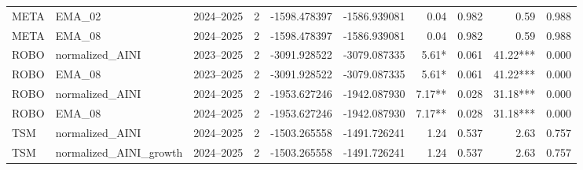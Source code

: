 \begin{table}[H]
{\begin{tabular}{l l l r r r r r r r}
META & EMA\_02 & 2024--2025 & 2 & -1598.478397 & -1586.939081 & 0.04 & 0.982 & 0.59 & 0.988 \\
META & EMA\_08 & 2024--2025 & 2 & -1598.478397 & -1586.939081 & 0.04 & 0.982 & 0.59 & 0.988 \\
ROBO & normalized\_AINI & 2023--2025 & 2 & -3091.928522 & -3079.087335 & 5.61* & 0.061 & 41.22*** & 0.000 \\
ROBO & EMA\_08 & 2023--2025 & 2 & -3091.928522 & -3079.087335 & 5.61* & 0.061 & 41.22*** & 0.000 \\
ROBO & normalized\_AINI & 2024--2025 & 2 & -1953.627246 & -1942.087930 & 7.17** & 0.028 & 31.18*** & 0.000 \\
ROBO & EMA\_08 & 2024--2025 & 2 & -1953.627246 & -1942.087930 & 7.17** & 0.028 & 31.18*** & 0.000 \\
TSM & normalized\_AINI & 2024--2025 & 2 & -1503.265558 & -1491.726241 & 1.24 & 0.537 & 2.63 & 0.757 \\
TSM & normalized\_AINI\_growth & 2024--2025 & 2 & -1503.265558 & -1491.726241 & 1.24 & 0.537 & 2.63 & 0.757 \\
\bottomrule
\end{tabular}

}
\end{table}